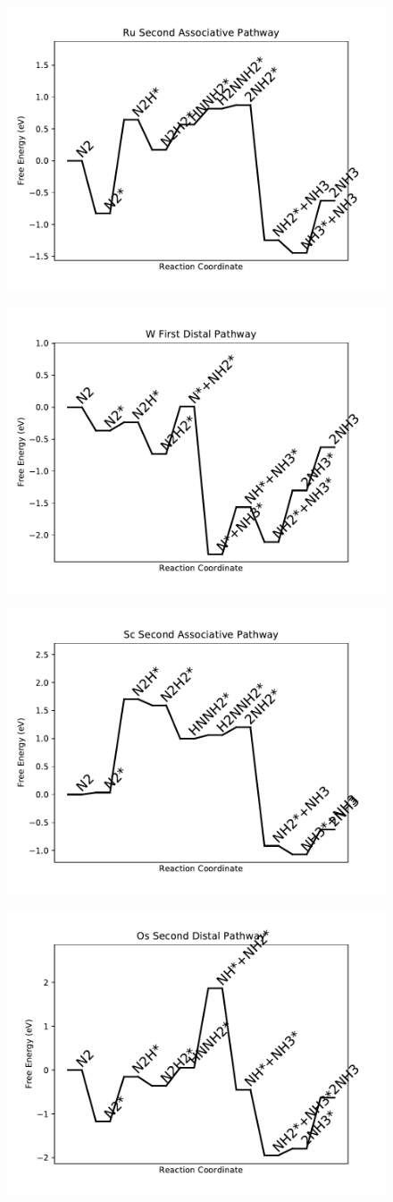 \documentclass[journal=jacsat,manuscript=article]{achemso}
\begin{document}
\begin{figure}
\includegraphics[width=0.5\linewidth]{data/plots/Ru_associative_2.pdf}
\label{fig:Ru_associative_2}
\end{figure}

\begin{figure}
\includegraphics[width=0.5\linewidth]{data/plots/W_distal_1.pdf}
\label{fig:W_distal_1}
\end{figure}

\begin{figure}
\includegraphics[width=0.5\linewidth]{data/plots/Sc_associative_2.pdf}
\label{fig:Sc_associative_2}
\end{figure}

\begin{figure}
\includegraphics[width=0.5\linewidth]{data/plots/Os_distal_2.pdf}
\label{fig:Os_distal_2}
\end{figure}
\end{document}
